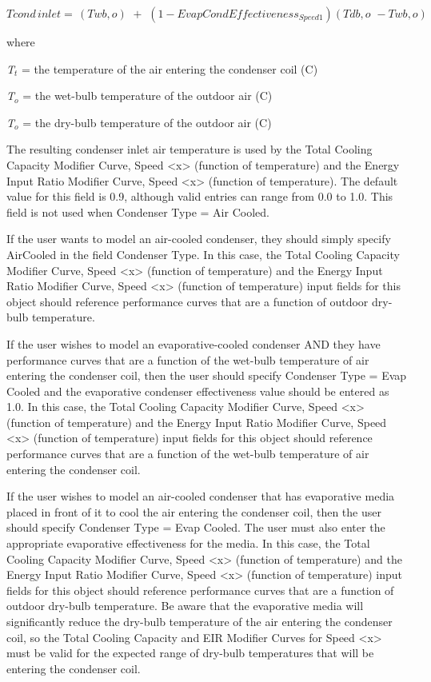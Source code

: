 \begin{equation}
Tcond\,inlet = \,\left( {Twb,o} \right)\,\, + \,\,\left( {1 - EvapCondEffectivenes{s_{Speed1}}} \right)\left( {Tdb,o\,\, - Twb,o} \right)
\end{equation}

where

\emph{T\(_{t}\)} = the temperature of the air entering the condenser coil (C)

\emph{T\(_{o}\)} = the wet-bulb temperature of the outdoor air (C)

\emph{T\(_{o}\)} = the dry-bulb temperature of the outdoor air (C)

The resulting condenser inlet air temperature is used by the Total Cooling Capacity Modifier Curve, Speed \textless{}x\textgreater{} (function of temperature) and the Energy Input Ratio Modifier Curve, Speed \textless{}x\textgreater{} (function of temperature). The default value for this field is 0.9, although valid entries can range from 0.0 to 1.0. This field is not used when Condenser Type = Air Cooled.

If the user wants to model an air-cooled condenser, they should simply specify AirCooled in the field Condenser Type. In this case, the Total Cooling Capacity Modifier Curve, Speed \textless{}x\textgreater{} (function of temperature) and the Energy Input Ratio Modifier Curve, Speed \textless{}x\textgreater{} (function of temperature) input fields for this object should reference performance curves that are a function of outdoor dry-bulb temperature.

If the user wishes to model an evaporative-cooled condenser AND they have performance curves that are a function of the wet-bulb temperature of air entering the condenser coil, then the user should specify Condenser Type = Evap Cooled and the evaporative condenser effectiveness value should be entered as 1.0. In this case, the Total Cooling Capacity Modifier Curve, Speed \textless{}x\textgreater{} (function of temperature) and the Energy Input Ratio Modifier Curve, Speed \textless{}x\textgreater{} (function of temperature) input fields for this object should reference performance curves that are a function of the wet-bulb temperature of air entering the condenser coil.

If the user wishes to model an air-cooled condenser that has evaporative media placed in front of it to cool the air entering the condenser coil, then the user should specify Condenser Type = Evap Cooled. The user must also enter the appropriate evaporative effectiveness for the media. In this case, the Total Cooling Capacity Modifier Curve, Speed \textless{}x\textgreater{} (function of temperature) and the Energy Input Ratio Modifier Curve, Speed \textless{}x\textgreater{} (function of temperature) input fields for this object should reference performance curves that are a function of outdoor dry-bulb temperature. Be aware that the evaporative media will significantly reduce the dry-bulb temperature of the air entering the condenser coil, so the Total Cooling Capacity and EIR Modifier Curves for Speed \textless{}x\textgreater{} must be valid for the expected range of dry-bulb temperatures that will be entering the condenser coil.

